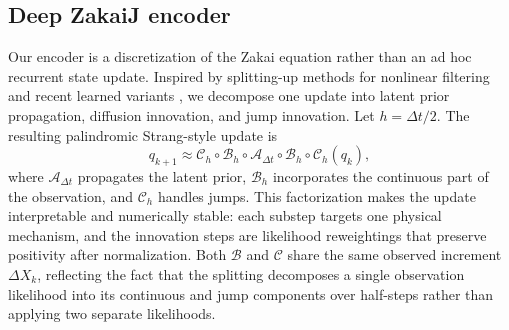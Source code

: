 \documentclass{article}
\newcommand{\lengComments}[1]{\par\smallskip\noindent\textcolor{lengCommentColor}{\textbf{[Leng comment:} #1\textbf{]}}\par\smallskip}
\begin{document}
\subsection{Deep ZakaiJ encoder}
\label{sec:encoder}
Our encoder is a discretization of the Zakai equation rather than an ad hoc recurrent state update. Inspired by splitting-up methods for nonlinear filtering and recent learned variants \citep{bensoussan1990approximation,zhang2024splitting,baagmark2023energy,spiteri2025beyond}, we decompose one update into latent prior propagation, diffusion innovation, and jump innovation. Let $h=\Delta t/2$. The resulting palindromic Strang-style update is
\begin{equation}
q_{k+1}
\approx
\mathcal{C}_{h}
\circ
\mathcal{B}_{h}
\circ
\mathcal{A}_{\Delta t}
\circ
\mathcal{B}_{h}
\circ
\mathcal{C}_{h}(q_k),
\label{eq:strang-update}
\end{equation}
where $\mathcal{A}_{\Delta t}$ propagates the latent prior, $\mathcal{B}_{h}$ incorporates the continuous part of the observation, and $\mathcal{C}_{h}$ handles jumps. This factorization makes the update interpretable and numerically stable: each substep targets one physical mechanism, and the innovation steps are likelihood reweightings that preserve positivity after normalization. Both $\mathcal{B}$ and $\mathcal{C}$ share the same observed increment $\Delta X_k$, reflecting the fact that the splitting decomposes a single observation likelihood into its continuous and jump components over half-steps rather than applying two separate likelihoods.


\end{document}

